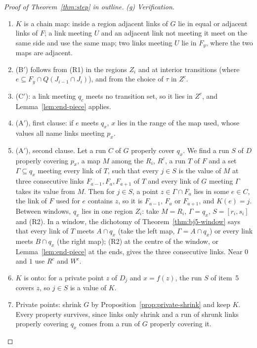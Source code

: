 \begin{proof}[Proof of Theorem~\ref{thm:step} in outline]
\emph{(g) Verification.}
\begin{enumerate}
\item $K$ is a chain map: inside a region adjacent links of $G$ lie in equal or adjacent links of $F$; a link meeting $U$ and an adjacent link not meeting it meet on the same side
and use the same map; two links meeting $U$ lie in $F_y$, where the two maps are adjacent.
\item (B$'$) follows from (R1) in the regions $Z_i$ and at interior transitions (where $e\subseteq F_y\cap Q(J_{i-1}\cap J_i)$), and from the choice of $\tau$ in $Z^c$.
\item (C$'$): a link meeting $q_c$ meets no transition set, so it lies in $Z^c$, and Lemma~\ref{lem:end-piece} applies.
\item (A$'$), first clause: if $e$ meets $q_x$, $x$ lies in the range of the map used, whose values all name links meeting $p_x$.
\item (A$'$), second clause. Let a run $C$ of $G$ properly cover $q_x$. We find a run $S$ of $D$ properly covering $p_x$, a map $M$ among the $R_i$, $R^c$, a run $T$ of $F$
and a set $\Gamma\subseteq q_x$ meeting every link of $T$, such that every $j\in S$ is the value of $M$ at three consecutive links $F_{a-1},F_a,F_{a+1}$ of $T$ and every
link of $G$ meeting $\Gamma$ takes its value from $M$. Then for $j\in S$, a point $z\in\Gamma\cap F_a$ lies in some $e\in C$, the link of $F$ used for $e$ contains $z$, so it is
$F_{a-1}$, $F_a$ or $F_{a+1}$, and $K(e)=j$. Between windows, $q_x$ lies in one region $Z_i$: take $M=R_i$, $\Gamma=q_x$, $S=[r_i,s_i]$ and (R2). In a window, the dichotomy of
Theorem~\ref{thm:bj5-window} says that every link of $T$ meets $A\cap q_x$ (take the left map, $\Gamma=A\cap q_x$) or every link meets $B\cap q_x$ (the right map); (R2) at the
centre of the window, or Lemma~\ref{lem:end-piece} at the ends, gives the three consecutive links. Near $0$ and $1$ use $R^c$ and $W^c$.
\item $K$ is onto: for a private point $z$ of $D_j$ and $x=f(z)$, the run $S$ of item~5 covers $z$, so $j\in S$ is a value of $K$.
\item Private points: shrink $G$ by Proposition~\ref{prop:private-shrink} and keep $K$. Every property survives, since links only shrink and a run of shrunk links properly
covering $q_x$ comes from a run of $G$ properly covering it.\qedhere
\end{enumerate}
\end{proof}


